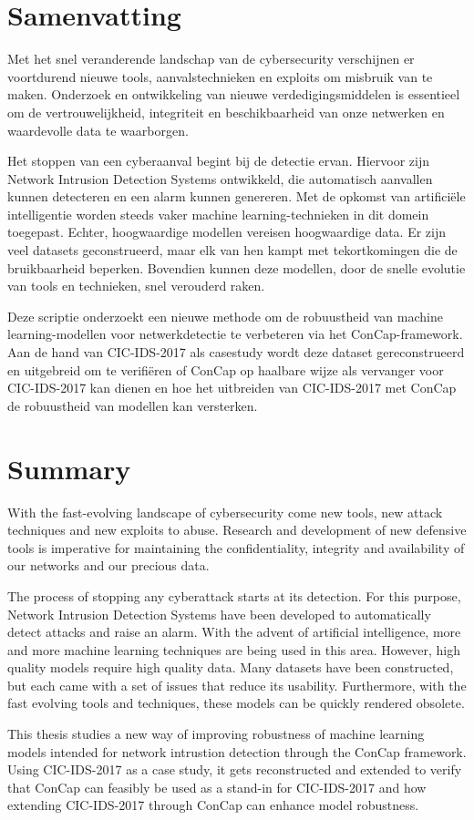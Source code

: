 \documentclass[english]{article}
\begin{document}
	\section*{Samenvatting}	
	Met het snel veranderende landschap van de cybersecurity verschijnen er voortdurend nieuwe tools, aanvalstechnieken en exploits om misbruik van te maken. Onderzoek en ontwikkeling van nieuwe verdedigingsmiddelen is essentieel om de vertrouwelijkheid, integriteit en beschikbaarheid van onze netwerken en waardevolle data te waarborgen.
	
	Het stoppen van een cyberaanval begint bij de detectie ervan. Hiervoor zijn Network Intrusion Detection Systems ontwikkeld, die automatisch aanvallen kunnen detecteren en een alarm kunnen genereren. Met de opkomst van artificiële intelligentie worden steeds vaker machine learning-technieken in dit domein toegepast. Echter, hoogwaardige modellen vereisen hoogwaardige data. Er zijn veel datasets geconstrueerd, maar elk van hen kampt met tekortkomingen die de bruikbaarheid beperken. Bovendien kunnen deze modellen, door de snelle evolutie van tools en technieken, snel verouderd raken.
	
	Deze scriptie onderzoekt een nieuwe methode om de robuustheid van machine learning-modellen voor netwerkdetectie te verbeteren via het ConCap-framework. Aan de hand van CIC-IDS-2017 als casestudy wordt deze dataset gereconstrueerd en uitgebreid om te verifiëren of ConCap op haalbare wijze als vervanger voor CIC-IDS-2017 kan dienen en hoe het uitbreiden van CIC-IDS-2017 met ConCap de robuustheid van modellen kan versterken.
	\newpage
	\section*{Summary}
	With the fast-evolving landscape of cybersecurity come new tools, new attack techniques and new exploits to abuse. Research and development of new defensive tools is imperative for maintaining the confidentiality, integrity and availability of our networks and our precious data. 
	
	The process of stopping any cyberattack starts at its detection. For this purpose, Network Intrusion Detection Systems have been developed to automatically detect attacks and raise an alarm. With the advent of artificial intelligence, more and more machine learning techniques are being used in this area. However, high quality models require high quality data. Many datasets have been constructed, but each came with a set of issues that reduce its usability. Furthermore, with the fast evolving tools and techniques, these models can be quickly rendered obsolete.
	
	This thesis studies a new way of improving robustness of machine learning models intended for network intrustion detection through the ConCap framework. Using CIC-IDS-2017 as a case study, it gets reconstructed and extended to verify that ConCap can feasibly be used as a stand-in for CIC-IDS-2017 and how extending CIC-IDS-2017 through ConCap can enhance model robustness.
	
\end{document}
